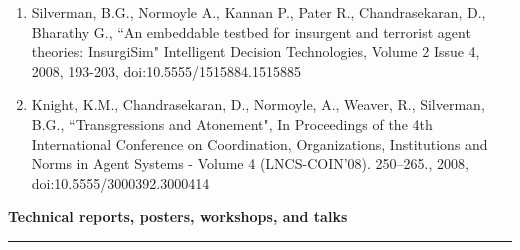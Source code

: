 \begin{enumerate}[leftmargin=*]
\item Silverman, B.G., Normoyle A., Kannan P., Pater R., Chandrasekaran, D., Bharathy G., ``An embeddable testbed for insurgent and terrorist agent theories: InsurgiSim" Intelligent Decision Technologies, Volume 2 Issue 4, 2008, 193-203, doi:10.5555/1515884.1515885

\item Knight, K.M., Chandrasekaran, D., Normoyle, A., Weaver, R., Silverman, B.G., ``Transgressions and Atonement", In Proceedings of the 4th International Conference on Coordination, Organizations, Institutions and Norms in Agent Systems - Volume 4 (LNCS-COIN'08). 250–265., 2008, doi:10.5555/3000392.3000414

\end{enumerate}
\medskip
\medskip

{\Large {\bf  Technical reports, posters, workshops, and talks}}
\vspace{0.1cm}
\hrule
\medskip

